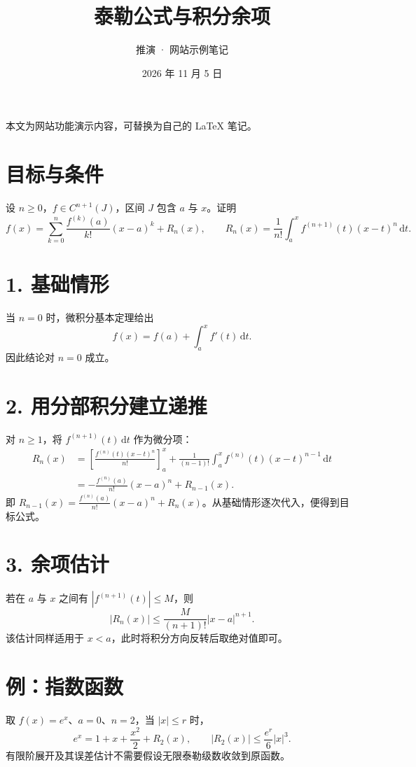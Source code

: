 \documentclass[11pt,a4paper,fontset=fandol]{ctexart}
\title{\color{forest}泰勒公式与积分余项}
\author{推演 · 网站示例笔记}
\date{2026 年 11 月 5 日}
\begin{document}
\maketitle
\begin{center}\small 本文为网站功能演示内容，可替换为自己的 LaTeX 笔记。\end{center}
\section*{目标与条件}
设 $n\ge0$，$f\in C^{n+1}(J)$，区间 $J$ 包含 $a$ 与 $x$。证明
\[
f(x)=\sum_{k=0}^n\frac{f^{(k)}(a)}{k!}(x-a)^k+R_n(x),\qquad
R_n(x)=\frac1{n!}\int_a^x f^{(n+1)}(t)(x-t)^n\,\mathrm{d}t.
\]
\section*{1. 基础情形}
当 $n=0$ 时，微积分基本定理给出
\[f(x)=f(a)+\int_a^x f'(t)\,\mathrm{d}t.\]
因此结论对 $n=0$ 成立。
\section*{2. 用分部积分建立递推}
对 $n\ge1$，将 $f^{(n+1)}(t)\,\mathrm{d}t$ 作为微分项：
\begin{align*}
R_n(x)&=\left[\frac{f^{(n)}(t)(x-t)^n}{n!}\right]_a^x
+\frac1{(n-1)!}\int_a^x f^{(n)}(t)(x-t)^{n-1}\,\mathrm{d}t\\
&=-\frac{f^{(n)}(a)}{n!}(x-a)^n+R_{n-1}(x).
\end{align*}
即 $R_{n-1}(x)=\frac{f^{(n)}(a)}{n!}(x-a)^n+R_n(x)$。从基础情形逐次代入，便得到目标公式。
\section*{3. 余项估计}
若在 $a$ 与 $x$ 之间有 $|f^{(n+1)}(t)|\le M$，则
\[
\boxed{|R_n(x)|\le\frac{M}{(n+1)!}|x-a|^{n+1}.}
\]
该估计同样适用于 $x<a$，此时将积分方向反转后取绝对值即可。
\section*{例：指数函数}
取 $f(x)=e^x$、$a=0$、$n=2$，当 $|x|\le r$ 时，
\[
e^x=1+x+\frac{x^2}{2}+R_2(x),\qquad
|R_2(x)|\le\frac{e^r}{6}|x|^3.
\]
有限阶展开及其误差估计不需要假设无限泰勒级数收敛到原函数。
\end{document}
